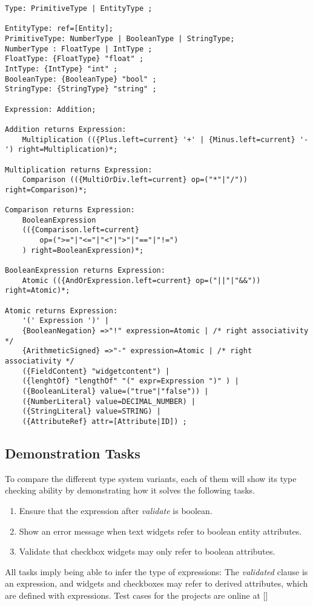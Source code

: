 \begin{lstlisting}[language=xtext,float,label=lst:grammar-plain-types-and-ex,caption=Type and Expression grammar] 
Type: PrimitiveType | EntityType ;

EntityType: ref=[Entity];
PrimitiveType: NumberType | BooleanType | StringType;
NumberType : FloatType | IntType ;
FloatType: {FloatType} "float" ;
IntType: {IntType} "int" ;
BooleanType: {BooleanType} "bool" ;
StringType: {StringType} "string" ;

Expression: Addition;

Addition returns Expression:
	Multiplication (({Plus.left=current} '+' | {Minus.left=current} '-') right=Multiplication)*;

Multiplication returns Expression:
	Comparison (({MultiOrDiv.left=current} op=("*"|"/")) right=Comparison)*; 

Comparison returns Expression:
	BooleanExpression 
	(({Comparison.left=current} 
		op=(">="|"<="|"<"|">"|"=="|"!=")
	) right=BooleanExpression)*;

BooleanExpression returns Expression:
	Atomic (({AndOrExpression.left=current} op=("||"|"&&")) right=Atomic)*;

Atomic returns Expression:
	'(' Expression ')' |
	{BooleanNegation} =>"!" expression=Atomic | /* right associativity */
	{ArithmeticSigned} =>"-" expression=Atomic | /* right associativity */
	({FieldContent} "widgetcontent") |
	({lenghtOf} "lengthOf" "(" expr=Expression ")" ) |
	({BooleanLiteral} value=("true"|"false")) |
	({NumberLiteral} value=DECIMAL_NUMBER) |
	({StringLiteral} value=STRING) |
	({AttributeRef} attr=[Attribute|ID]) ;
\end{lstlisting}



%

\subsection{Demonstration Tasks}
To compare the different type system variants, each of them will show its type checking ability by demonstrating how it solves the following tasks.
\begin{enumerate}
\item Ensure that the expression after \emph{validate} is boolean.
\item Show an error message when text widgets refer to boolean entity attributes.
\item Validate that checkbox widgets may only refer to boolean attributes.
\end{enumerate}

All tasks imply being able to infer the type of expressions: The \emph{validated} clause is an expression, and widgets and checkboxes may refer to derived attributes, which are defined with expressions. Test cases for the projects are online at []%
